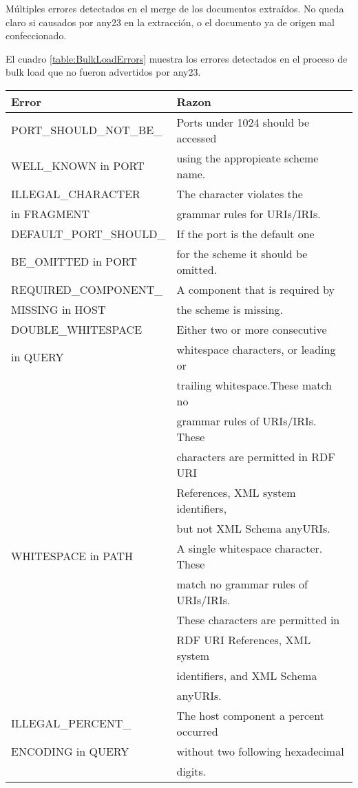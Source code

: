 \noindent Múltiples errores detectados en el merge de los documentos extraídos. No queda claro si causados por any23 en la extracción, o el documento ya de origen 
mal confeccionado. 

El cuadro \ref{table:BulkLoadErrors} muestra los errores detectados en el proceso de bulk load que no fueron advertidos por any23.\\
\begin{table}[h]
\begin{tabular}{| l | l | }\hline
Error & Razon \\\hline
PORT\_SHOULD\_NOT\_BE\_& Ports under 1024 should be accessed \\ WELL\_KNOWN  in PORT  & using the appropieate scheme name. \\\hline
ILLEGAL\_CHARACTER & The character violates the \\  in FRAGMENT & grammar rules for URIs/IRIs.\\\hline
DEFAULT\_PORT\_SHOULD\_& If the port is the default one \\ BE\_OMITTED in PORT  & for the scheme it should be omitted. \\\hline
REQUIRED\_COMPONENT\_& A component that is required by \\ MISSING in HOST & the scheme is missing.\\\hline
DOUBLE\_WHITESPACE& Either two or more consecutive \\  in QUERY  &  whitespace characters, or leading or \\ & trailing whitespace.These match no \\ & grammar rules  of URIs/IRIs. These \\ &  characters are  permitted in RDF URI \\ &  References, XML  system identifiers,\\ & but not XML Schema  anyURIs.\\\hline
WHITESPACE in PATH & A single whitespace character. These \\ &  match no grammar rules of URIs/IRIs. \\ &  These characters are permitted in \\ & RDF URI References, XML system \\ & identifiers, and XML Schema \\ & anyURIs.\\\hline
ILLEGAL\_PERCENT\_& The host component a percent occurred \\ ENCODING in QUERY  & without two following hexadecimal \\ & digits.\\\hline

\end{tabular}
\end{table}
